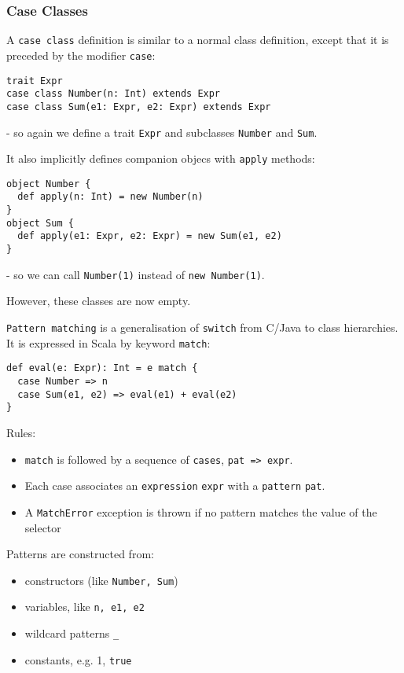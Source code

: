 \documentclass{scrartcl}
\newcommand{\term}[1]{\verb~#1~} %
\begin{document}
\subsubsection{Case Classes}
\label{sec:CaseClasses}

A \term{case class} definition is similar to a normal class definition, except
that it is preceded by the modifier \lstinline|case|:
\begin{lstlisting}
trait Expr
case class Number(n: Int) extends Expr
case class Sum(e1: Expr, e2: Expr) extends Expr
\end{lstlisting}
- so again we define a trait \lstinline|Expr| and subclasses \lstinline|Number|
and \lstinline|Sum|.

It also implicitly defines companion objecs with \lstinline|apply| methods:
\begin{lstlisting}
object Number {
  def apply(n: Int) = new Number(n)
}
object Sum {
  def apply(e1: Expr, e2: Expr) = new Sum(e1, e2)
}
\end{lstlisting}
- so we can call \lstinline|Number(1)| instead of \lstinline|new Number(1)|.

However, these classes are now empty.

\term{Pattern matching} is a generalisation of \lstinline|switch| from C/Java to
class hierarchies. It is expressed in Scala by keyword \lstinline|match|:
\begin{lstlisting}
def eval(e: Expr): Int = e match {
  case Number => n
  case Sum(e1, e2) => eval(e1) + eval(e2)
}
\end{lstlisting}
Rules:
\begin{itemize}
\item \lstinline|match| is followed by a sequence of \lstinline|cases|,
  \lstinline|pat => expr|.
\item Each case associates an \term{expression} \lstinline|expr| with a
  \term{pattern} \lstinline|pat|.
\item A \lstinline|MatchError| exception is thrown if no pattern matches the
  value of the selector
\end{itemize}
Patterns are constructed from:
\begin{itemize}
\item constructors (like \lstinline|Number, Sum|)
\item variables, like \lstinline|n, e1, e2|
\item wildcard patterns \lstinline|_|
\item constants, e.g. 1, \lstinline|true|
\end{itemize}
\end{document}
